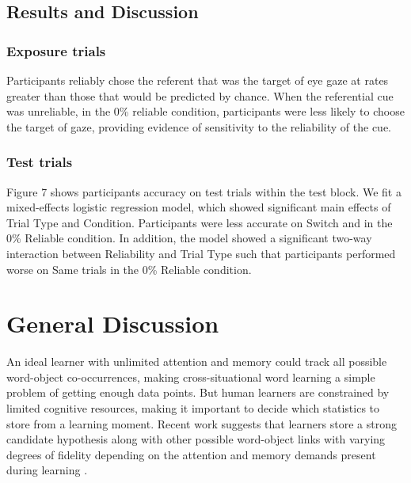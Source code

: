\documentclass[10pt,letterpaper]{article}
\begin{document}
\subsection{Results and Discussion}

\subsubsection{Exposure trials}
Participants reliably chose the referent that was the target of eye gaze at rates greater than those that would be predicted by chance. When the referential cue was unreliable, in the 0\% reliable condition, participants were less likely to choose the target of gaze, providing evidence of sensitivity to the reliability of the cue. 




\subsubsection{Test trials}
Figure 7 shows participants accuracy on test trials within the test block.  We fit a mixed-effects logistic regression model, which showed significant main effects of Trial Type and Condition.  Participants were less accurate on Switch and in the 0\% Reliable condition. In addition, the model showed a significant two-way interaction between Reliability and Trial Type such that participants performed worse on Same trials in the 0\% Reliable condition. 

\section{General Discussion}

An ideal learner with unlimited attention and memory could track all possible word-object co-occurrences, making cross-situational word learning a simple problem of getting enough data points. But human learners are constrained by limited cognitive resources, making it important to decide which statistics to store from a learning moment. Recent work suggests that learners store a strong candidate hypothesis along with other possible word-object links with varying degrees of fidelity depending on the attention and memory demands present during learning \cite{yurovsky2014algorithmic}. 
\end{document}
